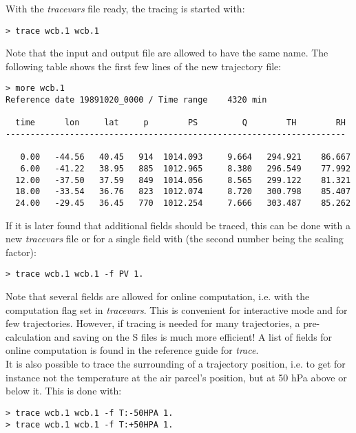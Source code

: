 \documentclass[a4paper,10pt]{article}
\begin{document}
\noindent
With the {\em tracevars} file ready, the tracing is started with:

\begin{verbatim}
> trace wcb.1 wcb.1
\end{verbatim}

\noindent
Note that the input and output file are allowed to have the same name. The following table shows the first few lines of the new trajectory file:

\begin{verbatim}
> more wcb.1 
Reference date 19891020_0000 / Time range    4320 min

  time      lon     lat     p        PS         Q        TH        RH
---------------------------------------------------------------------

   0.00   -44.56   40.45   914  1014.093     9.664   294.921    86.667
   6.00   -41.22   38.95   885  1012.965     8.380   296.549    77.992
  12.00   -37.50   37.59   849  1014.056     8.565   299.122    81.321
  18.00   -33.54   36.76   823  1012.074     8.720   300.798    85.407
  24.00   -29.45   36.45   770  1012.254     7.666   303.487    85.262
\end{verbatim}

\noindent
If it is later found that additional fields should be traced, this can be done with a new {\em tracevars} file or for a single field with (the second number being the scaling factor):

\begin{verbatim}
> trace wcb.1 wcb.1 -f PV 1.
\end{verbatim}

\noindent
Note that several fields are allowed for online computation, i.e. with the computation flag set in {\em tracevars}. This is convenient for interactive mode and for few trajectories. However, if tracing is needed for many trajectories, a pre-calculation and saving on the S files is much more efficient! A list of fields for online computation is found in the reference guide for {\em trace}. \\

\noindent
It is also possible to trace the surrounding of a trajectory position, i.e. to get for instance not the temperature at the air parcel's position, but at 50 hPa above or below it. This is done with:

\begin{verbatim}
> trace wcb.1 wcb.1 -f T:-50HPA 1.
> trace wcb.1 wcb.1 -f T:+50HPA 1.
\end{verbatim}
\end{document}
